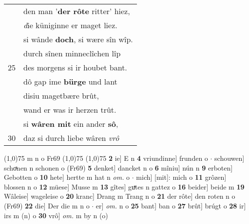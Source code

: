 \documentclass[8pt,a4paper,notitlepage]{article}
\begin{document}
\begin{table}[ht]
\begin{minipage}[t]{0.5\linewidth}
\begin{tabular}{rl}
 & den man '\textbf{der rôte} ritter' hiez,\\ 
 & \textit{d}ie küniginne er maget liez.\\ 
 & si wânde \textbf{doch}, si wære sîn wîp.\\ 
 & durch sînen minneclîchen lîp\\ 
25 & des morgens si ir houbet bant.\\ 
 & dô gap ime \textbf{bürge} und lant\\ 
 & disiu magetbære brût,\\ 
 & wand er was ir herzen trût.\\ 
 & si \textbf{wâren mit} ein ander \textbf{sô},\\ 
30 & daz si durch liebe wâren \textit{vrô}\\ 
\end{tabular}
\scriptsize
\line(1,0){75} \newline
m n o Fr69 \newline
\line(1,0){75} \newline
\newline
\line(1,0){75} \newline
\textbf{2} ie] E n \textbf{4} vriundinne] frunden o  $\cdot$ schouwen] schoͯnen n schonen o (Fr69) \textbf{5} denket] dancket n o \textbf{6} mîniu] nún n \textbf{9} erboten] Gebotten o \textbf{10} hete] hertte m hat n \textit{om.} o  $\cdot$ mich] [mit]: mich o \textbf{11} grôzen] blossen n o \textbf{12} müese] Musse m \textbf{13} gîtes] guͯtes n gattez o \textbf{16} beider] beide m \textbf{19} Wâleise] wageleise o \textbf{20} kranc] Drang m Trang n o \textbf{21} der rôte] den roten n o (Fr69) \textbf{22} die] Der die m n o  $\cdot$ er] \textit{om.} n o \textbf{25} bant] ban o \textbf{27} brût] brúgt o \textbf{28} ir] irs m (n) o \textbf{30} vrô] \textit{om.} m by n (o) \newline
\end{minipage}
\end{table}
\newpage
\end{document}
